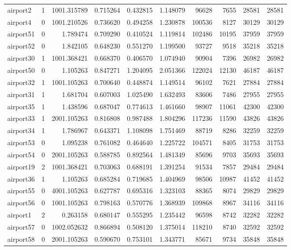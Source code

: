 \documentclass[../../../thesis.tex]{subfiles}
\begin{document}
\begin{longtable}{|l|r|r|r|r|r|r|r|r|r|}
airport2 & 1 & 1001.315789 & 0.715264 & 0.432815 & 1.148079 & 96628 & 7655 & 28581 & 28581 \\
airport4 & 0 & 1001.210526 & 0.736620 & 0.494258 & 1.230878 & 100536 & 8127 & 30129 & 30129 \\
airport51 & 0 & 1.789474 & 0.709290 & 0.410524 & 1.119814 & 102486 & 10195 & 37959 & 37959 \\
airport52 & 0 & 1.842105 & 0.648230 & 0.551270 & 1.199500 & 93727 & 9518 & 35218 & 35218 \\
airport30 & 1 & 1001.368421 & 0.668370 & 0.406570 & 1.074940 & 90904 & 7396 & 26982 & 26982 \\
airport50 & 0 & 1.105263 & 0.847271 & 1.204095 & 2.051366 & 122024 & 12130 & 46187 & 46187 \\
airport32 & 1 & 1001.105263 & 0.700640 & 0.448874 & 1.149514 & 96102 & 7621 & 27884 & 27884 \\
airport31 & 1 & 1.681704 & 0.607003 & 1.025490 & 1.632493 & 83606 & 7486 & 27955 & 27955 \\
airport35 & 1 & 1.438596 & 0.687047 & 0.774613 & 1.461660 & 98907 & 11061 & 42300 & 42300 \\
airport33 & 1 & 2001.105263 & 0.816808 & 0.987488 & 1.804296 & 117236 & 11590 & 43826 & 43826 \\
airport34 & 1 & 1.786967 & 0.643371 & 1.108098 & 1.751469 & 88719 & 8286 & 32259 & 32259 \\
airport53 & 0 & 1.095238 & 0.761082 & 0.464640 & 1.225722 & 104571 & 8405 & 31753 & 31753 \\
airport54 & 0 & 2001.105263 & 0.588785 & 0.892564 & 1.481349 & 85696 & 9703 & 35693 & 35693 \\
airport19 & 2 & 1001.368421 & 0.703063 & 0.688191 & 1.391254 & 91534 & 7857 & 29484 & 29484 \\
airport36 & 1 & 1.105263 & 0.685284 & 0.719685 & 1.404969 & 98506 & 10987 & 41452 & 41452 \\
airport55 & 0 & 4001.105263 & 0.627787 & 0.695316 & 1.323103 & 88365 & 8074 & 29829 & 29829 \\
airport56 & 0 & 1001.105263 & 0.798163 & 0.570776 & 1.368939 & 109868 & 8967 & 34116 & 34116 \\
airport1 & 2 & 0.263158 & 0.680147 & 0.555295 & 1.235442 & 96598 & 8742 & 32282 & 32282 \\
airport57 & 0 & 1002.052632 & 0.866894 & 0.508120 & 1.375014 & 118210 & 8740 & 32592 & 32592 \\
airport58 & 0 & 2001.105263 & 0.590670 & 0.753101 & 1.343771 & 85671 & 9734 & 35848 & 35848 \\

\end{longtable}
\end{document}
